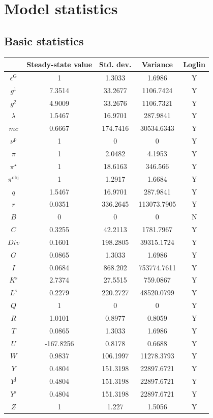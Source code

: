 \section{Model statistics}

\subsection{Basic statistics}

\begin{tabular}{c|c|c|c|c|}
  & Steady-state value & Std. dev. & Variance & Loglin\\
\hline
$\epsilon^{\mathrm{G}}$ & 1 & 1.3033 & 1.6986 & Y    \\
$g^{\mathrm{1}}$ & 7.3514 & 33.2677 & 1106.7424 & Y    \\
$g^{\mathrm{2}}$ & 4.9009 & 33.2676 & 1106.7321 & Y    \\
$\lambda$ & 1.5467 & 16.9701 & 287.9841 & Y    \\
${m\!c}$ & 0.6667 & 174.7416 & 30534.6343 & Y    \\
$\nu^{\mathrm{p}}$ & 1 & 0 & 0 & Y    \\
$\pi$ & 1 & 2.0482 & 4.1953 & Y    \\
$\pi^{\star}$ & 1 & 18.6163 & 346.566 & Y    \\
$\pi^{\mathrm{obj}}$ & 1 & 1.2917 & 1.6684 & Y    \\
$q$ & 1.5467 & 16.9701 & 287.9841 & Y    \\
$r$ & 0.0351 & 336.2645 & 113073.7905 & Y    \\
$B$ & 0 & 0 & 0 & N    \\
$C$ & 0.3255 & 42.2113 & 1781.7967 & Y    \\
${D\!i\!v}$ & 0.1601 & 198.2805 & 39315.1724 & Y    \\
$G$ & 0.0865 & 1.3033 & 1.6986 & Y    \\
$I$ & 0.0684 & 868.202 & 753774.7611 & Y    \\
$K^{\mathrm{s}}$ & 2.7374 & 27.5515 & 759.0867 & Y    \\
$L^{\mathrm{s}}$ & 0.2279 & 220.2727 & 48520.0799 & Y    \\
$Q$ & 1 & 0 & 0 & Y    \\
$R$ & 1.0101 & 0.8977 & 0.8059 & Y    \\
$T$ & 0.0865 & 1.3033 & 1.6986 & Y    \\
$U$ & -167.8256 & 0.8178 & 0.6688 & Y    \\
$W$ & 0.9837 & 106.1997 & 11278.3793 & Y    \\
$Y$ & 0.4804 & 151.3198 & 22897.6721 & Y    \\
$Y^{\mathrm{j}}$ & 0.4804 & 151.3198 & 22897.6721 & Y    \\
$Y^{\mathrm{s}}$ & 0.4804 & 151.3198 & 22897.6721 & Y    \\
$Z$ & 1 & 1.227 & 1.5056 & Y    \\
\hline
\end{tabular}


